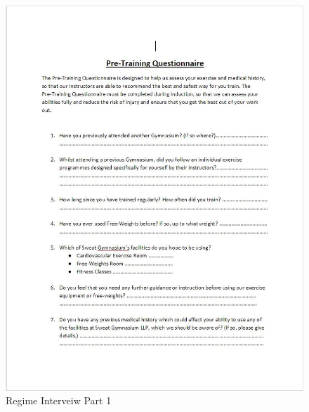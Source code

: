 \begin{figure}[H]
    \includegraphics[width=\textwidth]{Regime Interveiw 1.JPG}
    \caption{Regime Interveiw Part 1} \label{fig:Regime Interveiw Part 1}
\end{figure}

